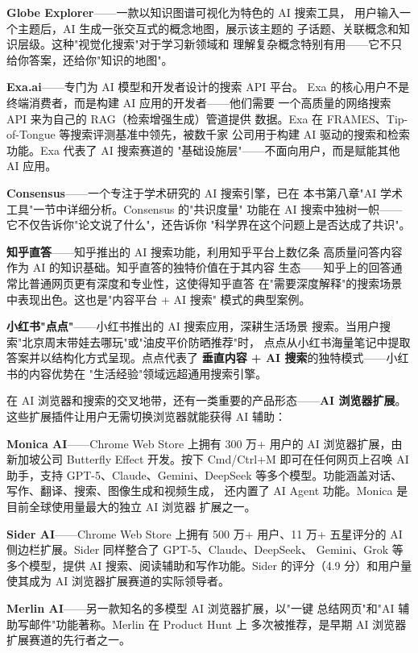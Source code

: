 \textbf{Globe Explorer}——一款以知识图谱可视化为特色的 AI 搜索工具，
用户输入一个主题后，AI 生成一张交互式的概念地图，展示该主题的
子话题、关联概念和知识层级。这种"视觉化搜索"对于学习新领域和
理解复杂概念特别有用——它不只给你答案，还给你"知识的地图"。

\textbf{Exa.ai}——专门为 AI 模型和开发者设计的搜索 API 平台。
Exa 的核心用户不是终端消费者，而是构建 AI 应用的开发者——他们需要
一个高质量的网络搜索 API 来为自己的 RAG（检索增强生成）管道提供
数据。Exa 在 FRAMES、Tip-of-Tongue 等搜索评测基准中领先，被数千家
公司用于构建 AI 驱动的搜索和检索功能。Exa 代表了 AI 搜索赛道的
"基础设施层"——不面向用户，而是赋能其他 AI 应用。

\textbf{Consensus}——一个专注于学术研究的 AI 搜索引擎，已在
本书第八章"AI 学术工具"一节中详细分析。Consensus 的"共识度量"
功能在 AI 搜索中独树一帜——它不仅告诉你"论文说了什么"，还告诉你
"科学界在这个问题上是否达成了共识"。

\textbf{知乎直答}——知乎推出的 AI 搜索功能，利用知乎平台上数亿条
高质量问答内容作为 AI 的知识基础。知乎直答的独特价值在于其内容
生态——知乎上的回答通常比普通网页更有深度和专业性，这使得知乎直答
在"需要深度解释"的搜索场景中表现出色。这也是"内容平台 + AI 搜索"
模式的典型案例。

\textbf{小红书"点点"}——小红书推出的 AI 搜索应用，深耕生活场景
搜索。当用户搜索"北京周末带娃去哪玩"或"油皮平价防晒推荐"时，
点点从小红书海量笔记中提取答案并以结构化方式呈现。点点代表了
\textbf{垂直内容 + AI 搜索}的独特模式——小红书的内容优势在
"生活经验"领域远超通用搜索引擎。

在 AI 浏览器和搜索的交叉地带，还有一类重要的产品形态——\textbf{AI
浏览器扩展}。这些扩展插件让用户无需切换浏览器就能获得 AI 辅助：

\textbf{Monica AI}——Chrome Web Store 上拥有 300 万+ 用户的 AI
浏览器扩展，由新加坡公司 Butterfly Effect 开发。按下 Cmd/Ctrl+M
即可在任何网页上召唤 AI 助手，支持 GPT-5、Claude、Gemini、DeepSeek
等多个模型。功能涵盖对话、写作、翻译、搜索、图像生成和视频生成，
还内置了 AI Agent 功能。Monica 是目前全球使用量最大的独立 AI 浏览器
扩展之一。

\textbf{Sider AI}——Chrome Web Store 上拥有 500 万+ 用户、11 万+
五星评分的 AI 侧边栏扩展。Sider 同样整合了 GPT-5、Claude、DeepSeek、
Gemini、Grok 等多个模型，提供 AI 搜索、阅读辅助和写作功能。Sider
的评分（4.9 分）和用户量使其成为 AI 浏览器扩展赛道的实际领导者。

\textbf{Merlin AI}——另一款知名的多模型 AI 浏览器扩展，以"一键
总结网页"和"AI 辅助写邮件"功能著称。Merlin 在 Product Hunt 上
多次被推荐，是早期 AI 浏览器扩展赛道的先行者之一。

